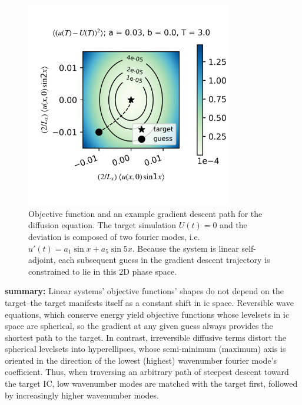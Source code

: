 \documentclass[longbibliography,twocolumn,amsmath,amssymb,aps,nofootinbib]{revtex4-2}
\begin{document}
\begin{figure}
  \includegraphics[width=9cm]{objtest_a0p03b0p0c0p0T3p0R0p015kt10p0kt20.png}
  \caption{Objective function and an example gradient descent path for the diffusion equation. The target simulation $U(t) = 0$ and the deviation is composed of two fourier modes, i.e. $u'(t) = a_1\sin x + a_5\sin 5x$. Because the system is linear self-adjoint, each subsequent guess in the gradient descent trajectory is constrained to lie in this 2D phase space.}
\end{figure}

\textbf{summary: }Linear systems' objective functions' shapes do not depend on the target--the target manifests itself as a constant shift in ic space. 
Reversible wave equations, which conserve energy yield objective functions whose levelsets in ic space are spherical, so the gradient at any given guess always provides the shortest path to the target. 
In contrast, irreversible diffusive terms distort the spherical levelsets into hyperellipses, whose semi-minimum (maximum) axis is oriented in the direction of the lowest (highest) wavenumber fourier mode's coefficient.
Thus, when traversing an arbitrary path of steepest descent toward the target IC, low wavenumber modes are matched with the target first, followed by increasingly higher wavenumber modes.
\clearpage
\end{document}
